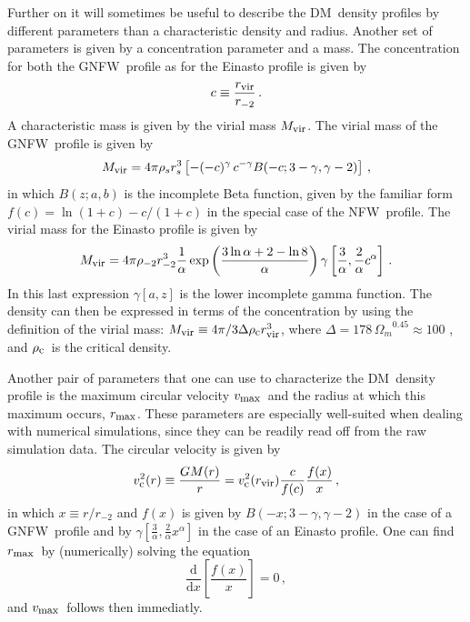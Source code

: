 \documentclass[aps,prd,twocolumn,amsmath,amssymb,floatfix,nofootinbib,10pt]{revtex4}
\newcommand{\NFW}{NFW}
\newcommand{\GNFW}{G\NFW}
\newcommand{\DM}{DM}
\newcommand{\dd}{\mathrm{d}}
\newcommand{\rhos}{\ensuremath{\rho_s}}
\newcommand{\rs}{\ensuremath{r_s}}
\newcommand{\rhominustwo}{\ensuremath{\rho_{-2}}}
\newcommand{\rminustwo}{\ensuremath{r_{-2}}}
\newcommand{\alphaEinasto}{\ensuremath{\alpha}}
\newcommand{\Mvir}{\ensuremath{M_{\mbox{{\footnotesize vir}}}}}
\newcommand{\Rvir}{\ensuremath{r_{\mbox{{\footnotesize vir}}}}}
\newcommand{\conc}{\ensuremath{c}}
\newcommand{\rhoc}{\ensuremath{\rho_{\mbox{{\footnotesize c}}}}}
\newcommand{\omegam}{\ensuremath{\Omega_{m}}}
\newcommand{\vcirc}{\ensuremath{v_{\mbox{{\footnotesize c}}}}}
\newcommand{\vmax}{\ensuremath{v_{\mbox{{\footnotesize max}}}}}
\newcommand{\rmax}{\ensuremath{r_{\mbox{{\footnotesize max}}}}}
\begin{document}
Further on it will sometimes be useful to describe the \DM\ density
profiles by different parameters than a characteristic density and
radius. Another set of parameters is given by a concentration
parameter and a mass. The concentration for both the \GNFW\ profile as
for the Einasto profile is given by
\begin{equation}\label{eq:concdef}
\conc \equiv \frac{\Rvir}{\rminustwo}\, .
\end{equation}
A characteristic mass is given by the virial mass \Mvir. The virial
mass of the \GNFW\ profile is given by
\begin{equation}\label{eq:Mvirdef}
\Mvir = 4\pi\rhos\rs^3 \left[ - (-\conc)^\gamma\,\conc^{-\gamma} B(-c;3-\gamma,\gamma-2)\right]\, ,
\end{equation}
in which $B(z;a,b)$ is the incomplete Beta function, given by the
familiar form $f(c) = \ln(1+c)-c/(1+c)$ in the special case of the
\NFW\ profile. The virial mass for the Einasto profile is given by
\begin{equation}
\Mvir = 4\pi\rhominustwo\rminustwo^3 \frac{1}{\alphaEinasto} \exp\left(\frac{3\ln \alphaEinasto + 2 - \ln 8}{\alphaEinasto}\right) \gamma\left[\frac{3}{\alphaEinasto},\frac{2}{\alphaEinasto}\conc^\alphaEinasto\right]\, .
\end{equation}
In this last expression $\gamma\left[a,z\right]$ is the lower
incomplete gamma function. The density can then be expressed in terms
of the concentration by using the definition of the virial mass:
$\Mvir \equiv 4\pi/3 \Delta \rhoc \Rvir^3$, where $\Delta = 178\,
\omegam^{0.45} \approx 100$
\cite{1996MNRAS.282..263E,1998ApJ...495...80B}, and \rhoc\ is the
critical density.

Another pair of parameters that one can use to characterize the \DM\
density profile is the maximum circular velocity \vmax\ and the radius
at which this maximum occurs, \rmax. These parameters are especially
well-suited when dealing with numerical simulations, since they can be
readily read off from the raw simulation data. The circular velocity
is given by
\begin{equation}
\vcirc^2(r) \equiv \frac{G M(r)}{r} = \vcirc^2(\Rvir)\frac{c}{f(c)}\frac{f(x)}{x}\, ,
\end{equation}
in which $x \equiv r/\rminustwo$ and $f(x)$ is given by
$B(-x;3-\gamma,\gamma-2)$ in the case of a \GNFW\ profile and by
$\gamma\left[\frac{3}{\alphaEinasto},\frac{2}{\alphaEinasto}x^\alphaEinasto\right]$
in the case of an Einasto profile. One can find \rmax\ by (numerically) solving the equation
\begin{equation}
\frac{\dd}{\dd x}\left[ \frac{f(x)}{x}\right] = 0\, ,
\end{equation}
and \vmax\ follows then immediatly.
\end{document}
